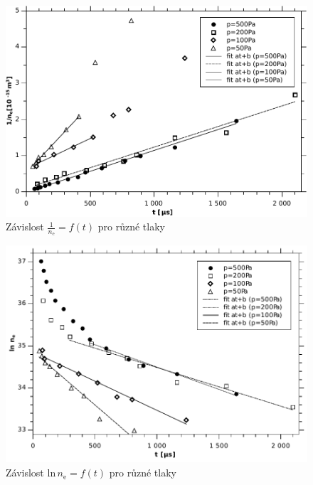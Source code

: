 \documentclass[12pt]{article}
\begin{document}
\begin{figure}[htbp]
\begin{center}
\includegraphics[width=13.5cm]{Graph2.pdf}
\caption{Závislost $\frac{1}{n_\mathrm{e}} = f(t)$ pro různé tlaky}
\label{1n}
\end{center}
\end{figure}

\begin{figure}[htbp]
\begin{center}
\includegraphics[width=13.5cm]{Graph3.pdf}
\caption{Závislost $\mathrm{ln}\, n_\mathrm{e} = f(t)$  pro různé tlaky}
\label{lnn}
\end{center}
\end{figure}
\end{document}
